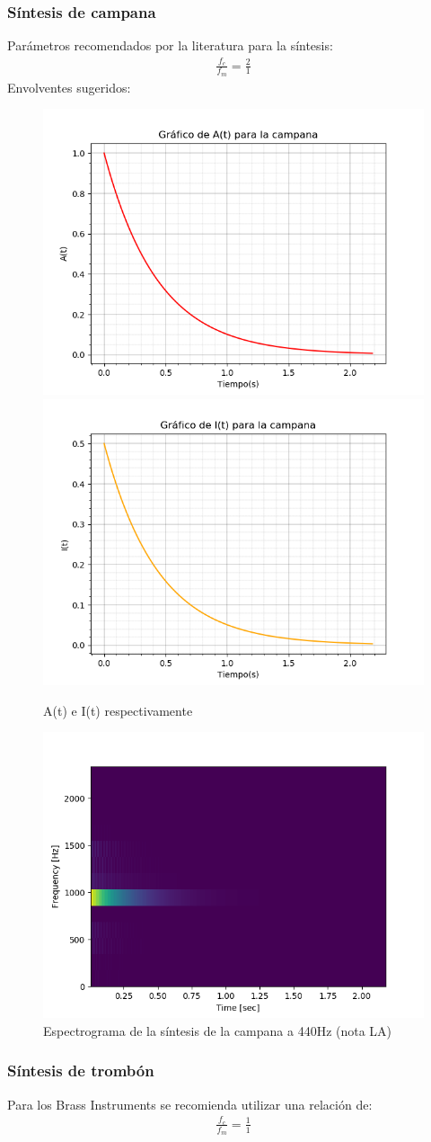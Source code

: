 \documentclass[assd_tp2_main.tex]{subfiles}
\begin{document}
\subsubsection{Síntesis de campana}
Parámetros recomendados por la literatura para la síntesis:
\begin{eqnarray*}
\displaystyle \frac{f_c}{f_m}=\frac{2}{1}
\end{eqnarray*}
Envolventes sugeridos:
\begin{figure}[H]
\centering
\includegraphics[width=0.4\linewidth]{graficos/EJ4/at_bell.png}
\includegraphics[width=0.4\linewidth]{graficos/EJ4/it_bell.png}
\caption{A(t) e I(t) respectivamente}
\label{fig:bell_envelopes}
\end{figure}

\begin{figure}[H]
\centering
\includegraphics[width=0.4\linewidth]{graficos/EJ4/BellEspectogram440Hz.png}
\caption{Espectrograma de la síntesis de la campana a 440Hz (nota LA)}
\label{fig:bell_440}
\end{figure}
\subsubsection{Síntesis de trombón}
Para los Brass Instruments se recomienda utilizar una relación de:
\begin{eqnarray*}
\displaystyle \frac{f_c}{f_m}=\frac{1}{1}
\end{eqnarray*}
\end{document}
